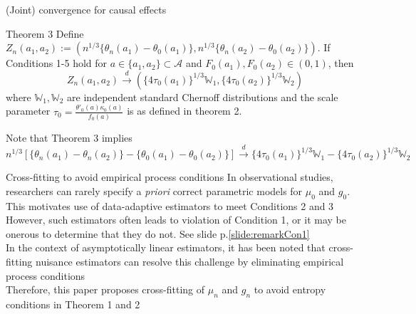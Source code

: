 \documentclass{beamer}
\newcommand{\f}[2]{\frac{#1}{#2}}
\newcommand{\vs}[1]{\vspace{#1 cm}}
\begin{document}
\begin{frame}{(Joint) convergence for causal effects}
  \begin{block}{Theorem 3}
    Define $Z_n(a_1,a_2) := \left( n^{1/3} \big\{ \theta_n(a_1) -\theta_0(a_1) \big\}, n^{1/3} \big\{ \theta_n(a_2) -\theta_0(a_2) \big\} \right)$. If Conditions 1-5 hold for $a \in \{a_1, a_2\} \subset \mathcal{A}$ and $F_0(a_1), F_0(a_2) \in (0,1)$, then
    $$
      Z_n(a_1,a_2) \stackrel{d}{\rightarrow}
      \left( \big\{ 4 \tau_0(a_1) \big\}^{1/3} \mathbb{W}_1, \big\{ 4 \tau_0(a_2) \big\}^{1/3} \mathbb{W}_2 \right)
    $$
    where $\mathbb{W}_1, \mathbb{W}_2$ are independent standard Chernoff distributions and the scale parameter $\tau_0 = \f{\theta'_0(a) \kappa_0(a)}{f_0(a)}$ is as defined in theorem 2.
  \end{block}
  Note that Theorem 3 implies
  $$
    \scriptstyle n^{1/3} \left[ \big\{ \theta_n(a_1) -\theta_n(a_2) \big\} -\big\{ \theta_0(a_1) -\theta_0(a_2) \big\} \right] \stackrel{d}{\rightarrow}
    \scriptstyle \big\{ 4 \tau_0(a_1) \big\}^{1/3} \mathbb{W}_1 -\big\{ 4 \tau_0(a_2) \big\}^{1/3} \mathbb{W}_2
  $$
\end{frame}

\begin{frame}{Cross-fitting to avoid empirical process conditions}
  In observational studies, researchers can rarely specify a \textit{priori} correct parametric models for $\mu_0$ and $g_0$.
  This motivates use of data-adaptive estimators to meet Conditions 2 and 3 \\
  \vs{0.3}
  However, such estimators often leads to violation of Condition 1, or it may be onerous to determine that they do not. See slide p.\ref{slide:remarkCon1} \\
  \vs{0.3}
  In the context of asymptotically linear estimators, it has been noted that cross-fitting nuisance estimators can resolve this challenge by eliminating empirical process conditions \\
  \vs{0.3}
  Therefore, this paper proposes cross-fitting of $\mu_n$ and $g_n$ to avoid entropy conditions in Theorem 1 and 2
\end{frame}
\end{document}
